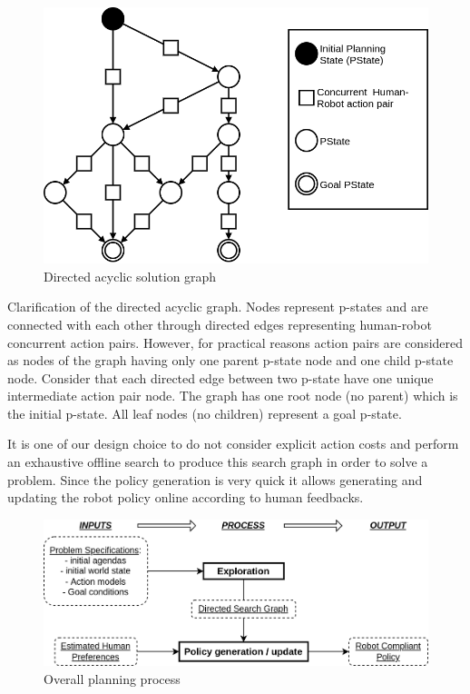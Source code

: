 \begin{figure}
    \centering
    \includegraphics[width=0.7\linewidth]{images/Chapter4/solution_graph.png}
    \caption{Directed acyclic solution graph}
    \label{fig:solution_graph}
\end{figure}

Clarification of the directed acyclic graph. Nodes represent p-states and are connected with each other through directed edges representing human-robot concurrent action pairs. However, for practical reasons action pairs are considered as nodes of the graph having only one parent p-state node and one child p-state node. Consider that each directed edge between two p-state have one unique intermediate action pair node. The graph has one root node (no parent) which is the initial p-state. All leaf nodes (no children) represent a goal p-state. 

It is one of our design choice to do not consider explicit action costs and perform an exhaustive offline search to produce this search graph in order to solve a problem. Since the policy generation is very quick it allows generating and updating the robot policy online according to human feedbacks. 


\begin{figure}
    \includegraphics[width=\linewidth]{images/Chapter4/overall_process.png}
    \caption{Overall planning process}
    \label{fig:overall_process}
\end{figure}




